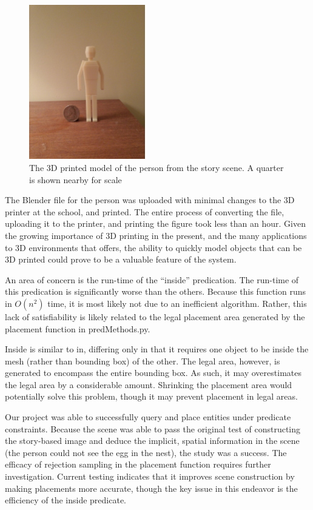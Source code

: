 \begin{figure}[h]
	\begin{center}
		\includegraphics[width=0.45\textwidth]{figures/3D_Print.jpg}
	\end{center}
	\caption{The 3D printed model of the person from the story scene. A quarter is shown nearby for scale}
	\label{fig:3D_Print}
\end{figure} 

The Blender file for the person was uploaded with minimal changes to the 3D printer at the school, and printed. The entire process of converting the file, uploading it to the printer, and printing the figure took less than an hour. Given the growing importance of 3D printing in the present, and the many applications to 3D environments that \TDS offers, the ability to quickly model objects that can be 3D printed could prove to be a valuable feature of the system.

An area of concern is the run-time of the ``inside'' predication.
The run-time of this predication is significantly worse than the others. Because this function runs in $O(n^2)$ time, it is most likely not due to an inefficient algorithm. Rather, this lack of satisfiability is likely related to the legal placement area generated by the placement function in predMethods.py.

Inside is similar to in, differing only in that it requires one object to be inside the mesh (rather than bounding box) of the other. The legal area, however, is generated to encompass the entire bounding box. As such, it may overestimates the legal area by a considerable amount. Shrinking the placement area would potentially solve this problem, though it may prevent placement in legal areas. 

Our project was able to successfully query and place entities under predicate constraints. Because the scene was able to pass the original test of constructing the story-based image and deduce the implicit, spatial information in the scene (the person could not see the egg in the nest), the study was a success. The efficacy of rejection sampling in the placement function requires further investigation. Current testing indicates that it improves scene construction by making placements more accurate, though the key issue in this endeavor is the efficiency of the inside predicate.

